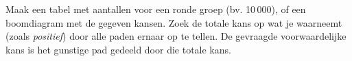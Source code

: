 \begin{werkwijze}
Maak een tabel met aantallen voor een ronde groep (bv. 10\,000), of een boomdiagram met de gegeven kansen. Zoek de totale kans op wat je waarneemt (zoals \textit{positief}) door alle paden ernaar op te tellen. De gevraagde voorwaardelijke kans is het gunstige pad gedeeld door die totale kans.
\end{werkwijze}

\begin{oefeningen}

\end{oefeningen}

\opdrachtenkop

\begin{oefeningen}

























\end{oefeningen}


